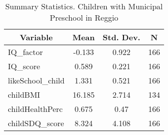 
\begin{table}[htbp]\centering \caption{Summary Statistics. Children with Municipal Preschool in Reggio \label{bothChildmaternaMuniReggio}}
\begin{tabular}{l c c  c}\hline\hline
\multicolumn{1}{c}{\textbf{Variable}} & \textbf{Mean}
 & \textbf{Std. Dev.} & \textbf{N}\\ \hline
IQ\_factor & -0.133 & 0.922  & 166\\
IQ\_score & 0.589 & 0.221  & 166\\
likeSchool\_child & 1.331 & 0.521  & 166\\
childBMI & 16.185 & 2.714  & 134\\
childHealthPerc & 0.675 & 0.47  & 166\\
childSDQ\_score & 8.324 & 4.108  & 166\\
\hline\end{tabular}
\end{table}

